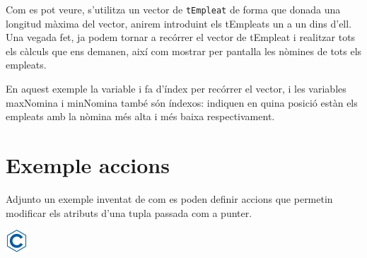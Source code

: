 \documentclass[]{book}
\begin{document}
Com es pot veure, s'utilitza un vector de \texttt{tEmpleat} de forma que
donada una longitud màxima del vector, anirem introduint els tEmpleats
un a un dins d'ell. Una vegada fet, ja podem tornar a recórrer el vector
de tEmpleat i realitzar tots els càlculs que ens demanen, així com
mostrar per pantalla les nòmines de tots els empleats.

En aquest exemple la variable i fa d'índex per recórrer el vector, i les
variables maxNomina i minNomina també són índexos: indiquen en quina
posició estàn els empleats amb la nòmina més alta i més baixa
respectivament.

\section{Exemple accions}\label{exemple-accions}

Adjunto un exemple inventat de com es poden definir accions que permetin
modificar els atributs d'una tupla passada com a punter.

\includegraphics{./img/c.png}
\end{document}
